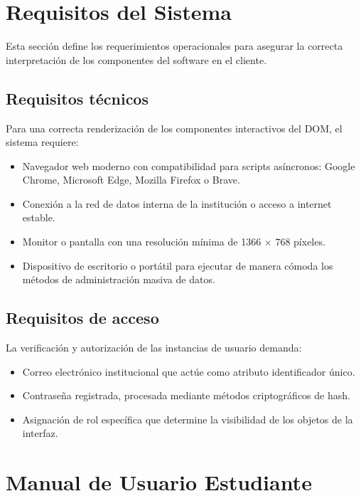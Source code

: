 \documentclass[12pt,letterpaper]{article}
\begin{document}
\section{Requisitos del Sistema}

Esta sección define los requerimientos operacionales para asegurar la correcta interpretación de los componentes del software en el cliente.

\subsection{Requisitos técnicos}

Para una correcta renderización de los componentes interactivos del DOM, el sistema requiere:
\begin{itemize}
    \item Navegador web moderno con compatibilidad para scripts asíncronos: Google Chrome, Microsoft Edge, Mozilla Firefox o Brave.
    \item Conexión a la red de datos interna de la institución o acceso a internet estable.
    \item Monitor o pantalla con una resolución mínima de 1366 $\times$ 768 píxeles.
    \item Dispositivo de escritorio o portátil para ejecutar de manera cómoda los métodos de administración masiva de datos.
\end{itemize}

\subsection{Requisitos de acceso}

La verificación y autorización de las instancias de usuario demanda:
\begin{itemize}
    \item Correo electrónico institucional que actúe como atributo identificador único.
    \item Contraseña registrada, procesada mediante métodos criptográficos de hash.
    \item Asignación de rol específica que determine la visibilidad de los objetos de la interfaz.
\end{itemize}

\section{Manual de Usuario Estudiante}
\end{document}
